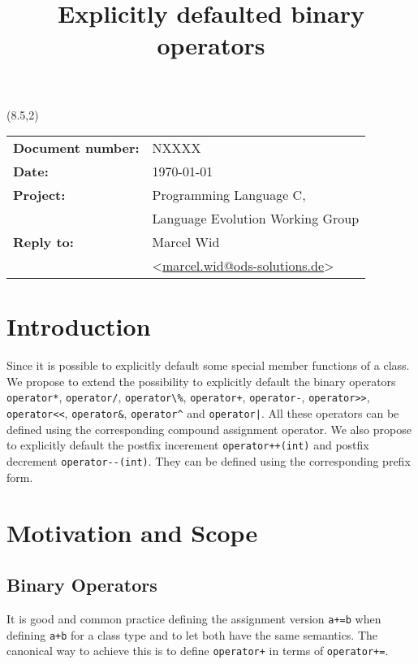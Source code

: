 \documentclass[a4paper,11pt,twoside,final]{article}
\title{Explicitly defaulted binary operators}
\author{}
\date{}
\newcommand{\tcode}[1]{\lstinline[basicstyle=\normalsize\ttfamily]{#1}}
\newcommand{\Rplus}{\protect\hspace{-.1em}\protect\raisebox{.1ex}{\small+}}
\newcommand{\Cpp}{\mbox{C\Rplus\Rplus}\xspace}
\numberwithin{equation}{subsection}
\begin{document}
\begin{textblock}{12}(8.5,2)
\begin{tabular}{l l}
\textbf{Document number:} & NXXXX\\
\textbf{Date:} & \today\\
\textbf{Project:} & Programming Language \Cpp,\\
& Language Evolution Working Group\\
\textbf{Reply to:} & Marcel Wid\\
& <\href{mailto:marcel.wid@ods-solutions.de}{marcel.wid@ods-solutions.de}>
\end{tabular}
\end{textblock}

\maketitle

\tableofcontents

\section{Introduction}
Since  it is possible to explicitly default some special member functions of a class. We propose to extend the possibility to explicitly default the binary operators \tcode{operator*}, \tcode{operator/}, \tcode{operator\%}, \tcode{operator+}, \tcode{operator-}, \tcode{operator>>}, \tcode{operator<<}, \tcode{operator&}, \tcode{operator^} and \tcode{operator|}. All these operators can be defined using the corresponding compound assignment operator. We also propose to explicitly default the postfix incerement \tcode{operator++(int)} and postfix decrement \tcode{operator--(int)}. They can be defined using the corresponding prefix form.

\section{Motivation and Scope}
\subsection{Binary Operators}
It is good and common practice defining the assignment version \tcode{a+=b} when defining \tcode{a+b} for a class type and to let both have the same semantics. The canonical way to achieve this is to define \tcode{operator+} in terms of \tcode{operator+=}.
\end{document}
